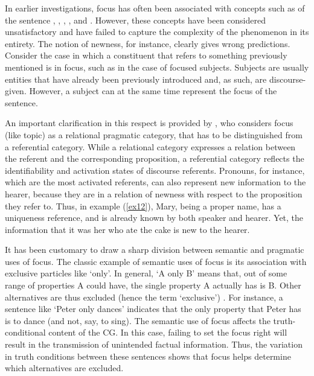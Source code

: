 In earlier investigations, focus has often been associated with concepts such as  of the sentence \parencite{bolinger1985two}, , ,  , and  \parencite{halliday_1967}. However, these concepts have been considered unsatisfactory and have failed to capture the complexity of the phenomenon in its entirety. The notion of newness, for instance, clearly gives wrong predictions. Consider the case in which a constituent that refers to something previously mentioned is in focus, such as in the case of focused subjects. Subjects are usually entities that have already been previously introduced and, as such, are discourse-given. However, a subject can at the same time represent the focus of the sentence.

An important clarification in this respect is provided by \textcite{lambrecht1996information}, who considers focus (like topic) as a relational pragmatic category, that has to be distinguished from a referential category. While a relational category expresses a relation between the referent and the corresponding proposition, a referential category reflects the identifiability and activation states of discourse referents. Pronouns, for instance, which are the most activated referents, can also represent new information to the hearer, because they are in a relation of newness with respect to the proposition they refer to. Thus, in example (\ref{ex12}), Mary, being a proper name, has a uniqueness reference, and is already known by both speaker and hearer. Yet, the information that it was her who ate the cake is new to the hearer. 

It has been customary to draw a sharp division between semantic and pragmatic uses of focus. The classic example of semantic uses of focus is its association with exclusive particles like `only’. In general, ‘A only B’ means that, out of some range of properties A could have, the single property A actually has is B. Other alternatives are thus excluded (hence the term ‘exclusive’) \parencite{velleman2016question}. For instance, a sentence like `Peter only dances' indicates that the only property that Peter has is to dance (and not, say, to sing).
The semantic use of focus affects the truth-conditional content of the CG. In this case, failing to set the focus right will result in the transmission of unintended factual information. Thus, the variation in truth conditions between these sentences shows that focus helps determine which alternatives are excluded.

